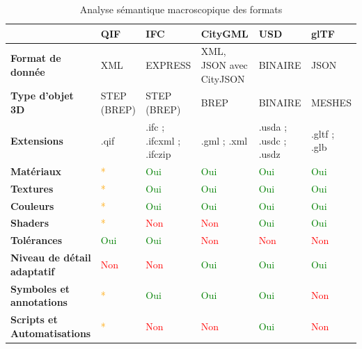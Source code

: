 \begin{table}[!h]
    \centering
    \caption{Analyse sémantique macroscopique des formats}
    \renewcommand{\arraystretch}{1.5} 
    \begin{tabularx}{\textwidth}{|l|X|X|X|X|X|} 
        \hline
        \rowcolor{white!75!black} \textbf{} & \textbf{QIF} & \textbf{IFC} & \textbf{CityGML} & \textbf{USD} & \textbf{glTF}\\
        \hline
        \textbf{Format de donnée} & XML & EXPRESS & XML, JSON avec CityJSON & BINAIRE & JSON \\
        \hline
        \textbf{Type d'objet 3D} & STEP (BREP) & STEP (BREP) & BREP & BINAIRE & MESHES \\
        \hline
        \textbf{Extensions} & .qif & .ifc ; .ifcxml ; .ifczip & .gml ; .xml & .usda ; .usdc ; .usdz  & .gltf ; .glb  \\
        \hline
        \textbf{Matériaux} & \textcolor{orange}{*\footnotemark{}} & \textcolor{green}{Oui} & \textcolor{green}{Oui} & \textcolor{green}{Oui} & \textcolor{green}{Oui} \\
        \hline
        \textbf{Textures} & \textcolor{orange}{*\footnotemark[\value{footnote}]} & \textcolor{green}{Oui} & \textcolor{green}{Oui} & \textcolor{green}{Oui} & \textcolor{green}{Oui} \\
        \hline
        \textbf{Couleurs} & \textcolor{orange}{*\footnotemark[\value{footnote}]} & \textcolor{green}{Oui} & \textcolor{green}{Oui} & \textcolor{green}{Oui} & \textcolor{green}{Oui} \\
        \hline
        \textbf{Shaders} & \textcolor{orange}{*\footnotemark[\value{footnote}]} & \textcolor{red}{Non} & \textcolor{red}{Non} & \textcolor{green}{Oui} & \textcolor{green}{Oui} \\
        \hline
        \textbf{Tolérances} &  \textcolor{green}{Oui} & \textcolor{green}{Oui} & \textcolor{red}{Non} & \textcolor{red}{Non} & \textcolor{red}{Non} \\
        \hline
        \textbf{Niveau de détail adaptatif} & \textcolor{red}{Non} & \textcolor{red}{Non} & \textcolor{green}{Oui} & \textcolor{green}{Oui} & \textcolor{green}{Oui} \\
        \hline
        \textbf{Symboles et annotations} & \textcolor{orange}{*\footnotemark[\value{footnote}]} & \textcolor{green}{Oui} & \textcolor{green}{Oui} & \textcolor{green}{Oui} & \textcolor{red}{Non} \\
        \hline
        \textbf{Scripts et Automatisations} & \textcolor{orange}{*\footnotemark[\value{footnote}]} & \textcolor{red}{Non} & \textcolor{red}{Non} & \textcolor{green}{Oui} & \textcolor{red}{Non} \\
        \hline
    \end{tabularx}
\end{table}

